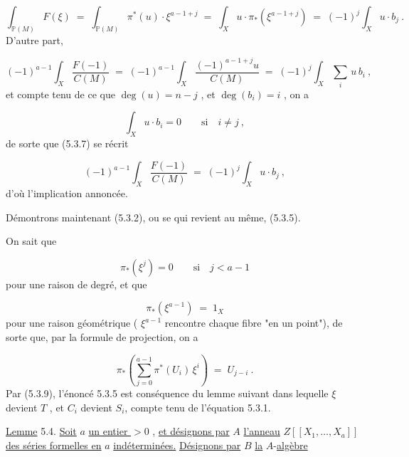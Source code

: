 \begin{equation}\tag{5.3.6}
\int_{\mathbb{P}(M)} F(\xi) \;=\; \int_{\mathbb{P}(M)} \pi^*(u) \cdot \xi^{a-1+j} \;=\; \int_X u \cdot \pi_*(\xi^{a-1+j}) \;=\; (-1)^j \int_X u \cdot b_j \ .
\end{equation}
D'autre part,

\begin{equation}\tag{5.3.7.}
(-1)^{a-1} \int_X \frac{F(-1)}{C(M)} \;=\; (-1)^{a-1} \int_X \frac{(-1)^{a-1+j}u}{C(M)} \;=\; (-1)^j \int_X \sum_i \, u \, b_i \ ,
\end{equation}
et compte tenu de ce que $\deg(u) = n-j$ , et $\deg(b_i) = i$ , on a

\begin{equation*}
\int_X u \cdot b_i = 0 \qquad \mbox{si} \quad i \neq j \ ,
\end{equation*}
de sorte que (5.3.7) se récrit

\begin{equation}\tag{5.3.8}
(-1)^{a-1} \int_X \frac{F(-1)}{C(M)} \;=\; (-1)^j \int_X u \cdot b_j \ ,
\end{equation}
d'où l'implication annoncée.

Démontrons maintenant (5.3.2), ou se qui revient au même, (5.3.5).



On sait que

\begin{equation*}
\pi_*(\xi^j) = 0 \qquad \mbox{si} \quad j < a-1
\end{equation*}
pour une raison de degré, et que

\begin{equation*}
\pi_*(\xi^{a-1}) \;=\; 1_X
\end{equation*}
pour une raison géométrique ( $\xi^{a-1}$ rencontre chaque fibre "en un point"), de sorte que, par la formule de projection, on a

\begin{equation}\tag{5.3.9}
\pi_*\left( \sum_{j=0}^{a-1} \pi^*(U_i) \, \xi^i \right) \;=\; U_{j-i} \ .
\end{equation}
Par (5.3.9), l'énoncé 5.3.5 est conséquence du lemme suivant  dans lequelle $\xi$ devient $T$ , et $C_i$ devient $S_i$, compte tenu de l'équation 5.3.1.

\underline{Lemme} 5.4. \underline{Soit} $a$ \underline{un entier $> 0$} , \underline{et désignons par} $A$ \underline{l'anneau} $Z[[X_1,\ldots,X_a]]$ \underline{des séries formelles en} $a$ \underline{indéterminées.} \underline{Désignons par} $B$ \underline{la} $A$-\underline{algèbre}

